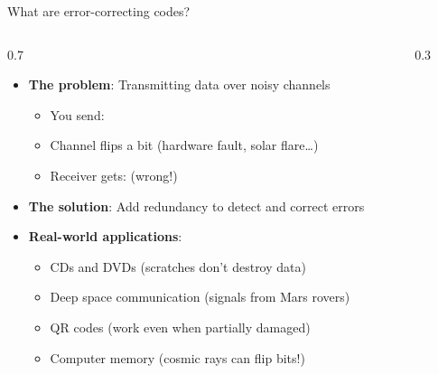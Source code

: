 \ifdefined\PRESENTATION\else\PassOptionsToClass{handout}{beamer}\fi\documentclass[aspectratio=169, lualatex]{beamer}
\begin{document}
\begin{frame}{What are error-correcting codes?}
	\begin{columns}[c]
		\begin{column}{0.7\textwidth}
			\begin{itemize}
				\item \textbf{The problem}: Transmitting data over noisy channels
				      \begin{itemize}
					      \item You send: 
					      \item Channel flips a bit (hardware fault, solar flare\ldots)
					      \item Receiver gets:  (wrong!)
				      \end{itemize}
				\item \textbf{The solution}: Add redundancy to detect and correct errors
				\item \textbf{Real-world applications}:
				      \begin{itemize}
					      \item CDs and DVDs (scratches don't destroy data)
					      \item Deep space communication (signals from Mars rovers)
					      \item QR codes (work even when partially damaged)
					      \item Computer memory (cosmic rays can flip bits!)
				      \end{itemize}
			\end{itemize}
		\end{column}
		\begin{column}{0.3\textwidth}
		\end{column}
	\end{columns}

\end{frame}
\end{document}
